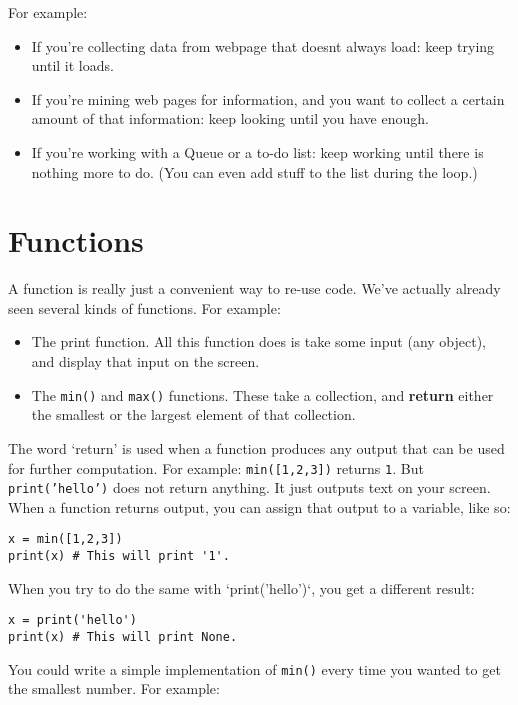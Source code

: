 \documentclass[12pt]{book}
\begin{document}
\noindent For example:

\begin{itemize}
\item If you're collecting data from webpage that doesnt always load: keep
  trying until it loads.
\item If you're mining web pages for information, and you want to collect a
  certain amount of that information: keep looking until you have
  enough.
\item If you're working with a Queue or a to-do list: keep working until
  there is nothing more to do. (You can even add stuff to the list
  during the loop.)
\end{itemize}

\section{Functions}

A function is really just a convenient way to re-use code. We've
actually already seen several kinds of functions. For example:

\begin{itemize}
\item The print function. All this function does is take some input (any
  object), and display that input on the screen.
\item The \texttt{min()} and \texttt{max()} functions. These take a
  collection, and \textbf{return} either the smallest or the largest
  element of that collection.
\end{itemize}

The word `return' is used when a function produces any output that can be used for further computation. For example: \texttt{min({[}1,2,3{]})} returns \texttt{1}. But \texttt{print('hello')} does not return anything. It just outputs text on your screen. When a function returns output, you can assign that output to a variable, like so:

\begin{lstlisting}
x = min([1,2,3])
print(x) # This will print '1'.
\end{lstlisting}

When you try to do the same with `print('hello')`, you get a different result:

\begin{lstlisting}
x = print('hello')
print(x) # This will print None.
\end{lstlisting}

You could write a simple implementation of \texttt{min()} every time you wanted to get
the smallest number. For example:
\end{document}
